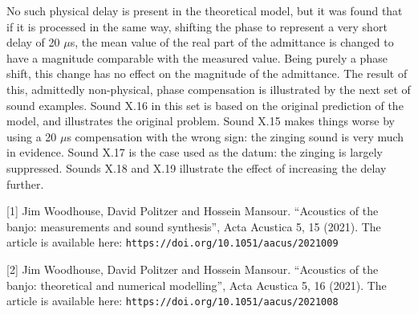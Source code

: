   No such physical delay is present in the theoretical model, but it was found 
  that if it is processed in the same way, shifting the phase to represent a 
  very short delay of 20 $\mu$s, the mean value of the real part of the 
  admittance is changed to have a magnitude comparable with the measured value. 
  Being purely a phase shift, this change has no effect on the magnitude of the 
  admittance. The result of this, admittedly non-physical, phase compensation 
  is illustrated by the next set of sound examples. Sound X.16 in this set is 
  based on the original prediction of the model, and illustrates the original 
  problem. Sound X.15 makes things worse by using a 20 $\mu$s compensation with 
  the wrong sign: the zinging sound is very much in evidence. Sound X.17 is the 
  case used as the datum: the zinging is largely suppressed. Sounds X.18 and 
  X.19 illustrate the effect of increasing the delay further. 

\audio{}

\audio{}

\audio{}

\audio{}

\audio{}

  \sectionreferences{}[1] Jim Woodhouse, David Politzer and Hossein Mansour. 
  “Acoustics of the banjo: measurements and sound synthesis”, Acta Acustica 5, 
  15 (2021). The article is available here: 
  \tt{}https://doi.org/10.1051/aacus/2021009\rm{} 

  [2] Jim Woodhouse, David Politzer and Hossein Mansour. “Acoustics of the 
  banjo: theoretical and numerical modelling”, Acta Acustica 5, 16 (2021). The 
  article is available here: \tt{}https://doi.org/10.1051/aacus/2021008\rm{} 